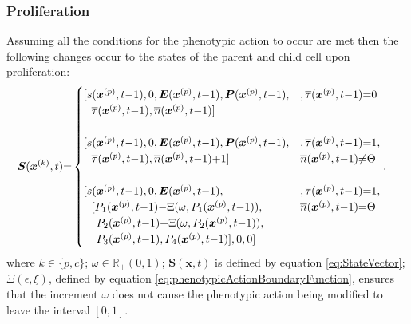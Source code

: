 \documentclass[\main/thesis.tex]{subfiles}
\begin{document}
\subsubsection{Proliferation}
Assuming all the conditions for the phenotypic action to occur are met then 
the following changes occur to the states of the parent and child cell upon proliferation:
\begin{align}
&\boldsymbol{S}(\boldsymbol{x}^{(k)}, t) {=} \begin{cases}
                     [ s(\boldsymbol{x}^{(p)}, t{-}1), 0, 
                       \boldsymbol{E}(\boldsymbol{x}^{(p)}, t{-}1),
                       \boldsymbol{P}(\boldsymbol{x}^{(p)}, t{-}1),
                       & ,\overline{\tau}(\boldsymbol{x}^{(p)}, t{-}1) {=} 0 \\
                     \hspace{0.25cm} \overline{\tau}(\boldsymbol{x}^{(p)}, t{-}1), 
                     \overline{n}(\boldsymbol{x}^{(p)}, t{-}1) ] \\
                     \\
                     [ s(\boldsymbol{x}^{(p)}, t{-}1), 0,
                        \boldsymbol{E}(\boldsymbol{x}^{(p)}, t{-}1),
                        \boldsymbol{P}(\boldsymbol{x}^{(p)}, t{-}1),
                       & ,\overline{\tau}(\boldsymbol{x}^{(p)}, t{-}1) {=} 1, \\
                       \hspace{0.25cm} \overline{\tau}(\boldsymbol{x}^{(p)}, t{-}1),
                       \overline{n}(\boldsymbol{x}^{(p)}, t{-}1){+}1 ]
                       & \overline{n}(\boldsymbol{x}^{(p)}, t{-}1) {\ne} \Theta \\
                     \\
                     [ s(\boldsymbol{x}^{(p)}, t{-}1), 0,
                        \boldsymbol{E}(\boldsymbol{x}^{(p)}, t{-}1),
                       & , \overline{\tau}(\boldsymbol{x}^{(p)}, t{-}1) {=} 1, \\
                     \hspace{0.25cm} [ P_1(\boldsymbol{x}^{(p)}, t{-}1) {-} \Xi(\omega, P_1(\boldsymbol{x}^{(p)}, t{-}1)),
                     & \overline{n}(\boldsymbol{x}^{(p)}, t{-}1) {=} \Theta \\
                     \hspace{0.4cm}  P_2(\boldsymbol{x}^{(p)}, t{-}1) {+} \Xi(\omega, P_2(\boldsymbol{x}^{(p)}, t{-}1)),\\
                       \hspace{0.4cm} P_3(\boldsymbol{x}^{(p)}, t{-}1), 
                       P_4(\boldsymbol{x}^{(p)}, t{-}1) ], 0, 0 ]
                    \end{cases}, \label{eq:ProliferationStateChange}
\end{align}
where $k {\in} \{ p, c \}$; $\omega {\in} \mathbb{R}_+(0, 1)$; $\boldsymbol{S}(\boldsymbol{x}, t)$ is defined by equation \eqref{eq:StateVector}; $\Xi(\epsilon, \xi)$, defined by equation \eqref{eq:phenotypicActionBoundaryFunction}, ensures that the increment $\omega$ does not cause the phenotypic action being modified to leave the interval $[0, 1]$.
\end{document}
